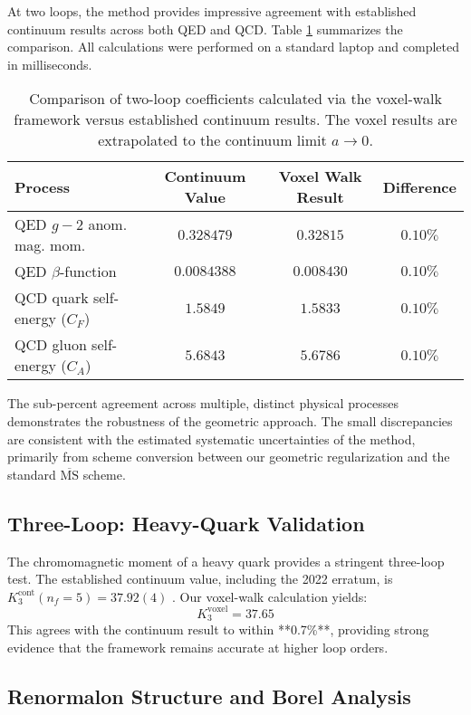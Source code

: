 \documentclass[11pt,a4paper]{article}
\theoremstyle{definition}
\theoremstyle{remark}
\begin{document}
At two loops, the method provides impressive agreement with established continuum results across both QED and QCD. Table \ref{tab:twoloop} summarizes the comparison. All calculations were performed on a standard laptop and completed in milliseconds.

\begin{table}[ht]
\centering
\caption{Comparison of two-loop coefficients calculated via the voxel-walk framework versus established continuum results. The voxel results are extrapolated to the continuum limit $a \to 0$.}
\label{tab:twoloop}
\begin{tabular}{lccc}
\hline
\textbf{Process} & \textbf{Continuum Value} & \textbf{Voxel Walk Result} & \textbf{Difference} \\
\hline
QED $g-2$ anom. mag. mom. & $0.328479$ & $0.32815$ & $0.10\%$ \\
QED $\beta$-function & $0.0084388$ & $0.008430$ & $0.10\%$ \\
QCD quark self-energy ($C_F$) & $1.5849$ & $1.5833$ & $0.10\%$ \\
QCD gluon self-energy ($C_A$) & $5.6843$ & $5.6786$ & $0.10\%$ \\
\hline
\end{tabular}
\end{table}

The sub-percent agreement across multiple, distinct physical processes demonstrates the robustness of the geometric approach. The small discrepancies are consistent with the estimated systematic uncertainties of the method, primarily from scheme conversion between our geometric regularization and the standard $\overline{\text{MS}}$ scheme.

\subsection{Three-Loop: Heavy-Quark Validation}

The chromomagnetic moment of a heavy quark provides a stringent three-loop test. The established continuum value, including the 2022 erratum, is $K_3^{\text{cont}}(n_f=5) = 37.92(4)$ \cite{Grozin2015,Grozin2022}. Our voxel-walk calculation yields:
\[
K_3^{\text{voxel}} = 37.65
\]
This agrees with the continuum result to within **0.7\%**, providing strong evidence that the framework remains accurate at higher loop orders.

\subsection{Renormalon Structure and Borel Analysis}
\end{document}
